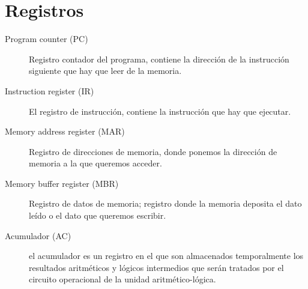 \documentclass[12pt]{article}
\begin{document}
\section{Registros}
\label{sec:orgbce3bdd}
\begin{description}
\item[{Program counter (PC)}] Registro contador del programa, contiene la dirección de la instrucción siguiente que hay que leer de la memoria.

\item[{Instruction register (IR)}] El registro de instrucción, contiene la instrucción que hay que ejecutar.

\item[{Memory address register (MAR)}] Registro de direcciones de memoria, donde ponemos la dirección de memoria a la que queremos acceder.

\item[{Memory buffer register (MBR)}] Registro de datos de memoria; registro donde la memoria deposita el dato leído o el dato que queremos escribir.

\item[{Acumulador (AC)}] el acumulador es un registro en el que son almacenados temporalmente los resultados aritméticos y lógicos intermedios que serán tratados por el circuito operacional de la unidad aritmético-lógica.
\end{description}

\pagebreak
\end{document}
